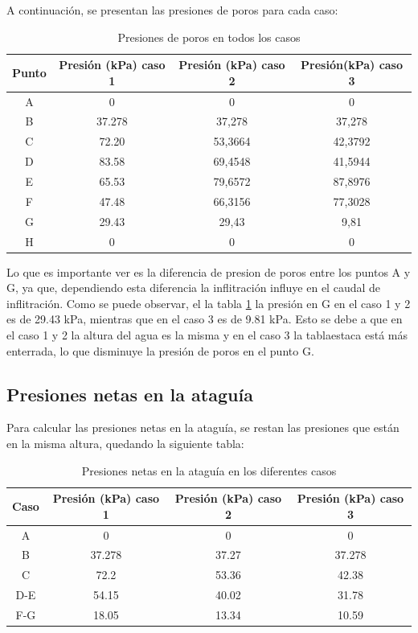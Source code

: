 \documentclass{article}
\begin{document}
\newpage

A continuación, se presentan las presiones de poros para cada caso:




\begin{table}[h!]
  \centering
    \begin{tabular}{cccc}
    \hline
    \textbf{Punto} & \textbf{Presión (kPa) caso 1} & \textbf{Presión (kPa) caso 2}& \textbf{Presión(kPa) caso 3}\\
    \hline
    A &0     &  0       & 0       \\ 
    B &37.278&  37,278  & 37,278  \\ 
    C &72.20 &  53,3664 & 42,3792 \\ 
    D &83.58 &  69,4548 & 41,5944 \\ 
    E &65.53 &  79,6572 & 87,8976 \\ 
    F & 47.48&  66,3156 & 77,3028 \\ 
    G &29.43 &  29,43   & 9,81     \\ 
    H &0     &  0       & 0        \\ 
    \hline
    \end{tabular}
  \caption{Presiones de poros en todos los casos}
  \label{tab:presion2}
\end{table}
  

    
Lo que es importante ver es la diferencia de presion de poros entre los puntos A y G, ya que, dependiendo esta diferencia la inflitración influye en el caudal de inflitración. Como se puede observar, el la tabla \ref{tab:presion2} la presión en G en el caso 1 y 2 es de 29.43 kPa, mientras que en el caso 3 es de 9.81 kPa. Esto se debe a que en el caso 1 y 2 la altura del agua es la misma y en el caso 3 la tablaestaca está más enterrada, lo que disminuye la presión de poros en el punto G.



\subsection{Presiones netas en la ataguía}
Para calcular las presiones netas en la ataguía, se restan las presiones que están en la misma altura, quedando la siguiente tabla:

\begin{table}[h!]
  \centering
  \begin{tabular}{cccc}
    \hline
    \textbf{Caso} & \textbf{Presión (kPa) caso 1} & \textbf{Presión (kPa) caso 2} & \textbf{Presión (kPa) caso 3} \\ \hline
    A   & 0      & 0      & 0      \\ 
    B   & 37.278 & 37.27  & 37.278 \\ 
    C   & 72.2   & 53.36  & 42.38  \\ 
    D-E & 54.15  & 40.02  & 31.78  \\ 
    F-G & 18.05  & 13.34  & 10.59  \\ \hline
  \end{tabular}
  \caption{Presiones netas en la ataguía en los diferentes casos}
  \label{tab:presion_neta1}
\end{table}
\end{document}
